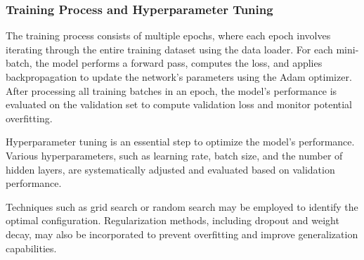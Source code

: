 \subsubsection{Training Process and Hyperparameter Tuning}

The training process consists of multiple epochs, where each epoch involves iterating through the entire training dataset using the data loader.
For each mini-batch, the model performs a forward pass, computes the loss, and applies backpropagation to update the network’s parameters using the Adam optimizer.
After processing all training batches in an epoch, the model’s performance is evaluated on the validation set to compute validation loss and monitor potential overfitting.

Hyperparameter tuning is an essential step to optimize the model’s performance.
Various hyperparameters, such as learning rate, batch size, and the number of hidden layers, are systematically adjusted and evaluated based on validation performance.

Techniques such as grid search or random search may be employed to identify the optimal configuration. Regularization methods, including dropout and weight decay, may also be incorporated to prevent overfitting and improve generalization capabilities.




